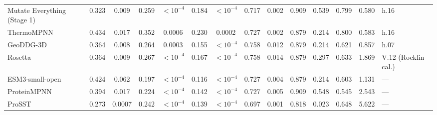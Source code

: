 \begin{table}[H]
{\begin{tabular}{lccccccccccccl}
Mutate Everything (Stage 1) & 0.323 & 0.009 & 0.259 & $<10^{-4}$ & 0.184 & $<10^{-4}$ & 0.717 & 0.002 & 0.909 & 0.539 & 0.799 & 0.580 & h.16 \\
ThermoMPNN & 0.434 & 0.017 & 0.352 & 0.0006 & 0.230 & 0.0002 & 0.727 & 0.002 & 0.879 & 0.214 & 0.800 & 0.583 & h.16 \\
GeoDDG-3D & 0.364 & 0.008 & 0.264 & 0.0003 & 0.155 & $<10^{-4}$ & 0.758 & 0.012 & 0.879 & 0.214 & 0.621 & 0.857 & h.07 \\
Rosetta & 0.364 & 0.009 & 0.267 & $<10^{-4}$ & 0.167 & $<10^{-4}$ & 0.758 & 0.014 & 0.879 & 0.297 & 0.633 & 1.869 & V.12 (Rocklin cal.) \\
ESM3-small-open & 0.424 & 0.062 & 0.197 & $<10^{-4}$ & 0.116 & $<10^{-4}$ & 0.727 & 0.004 & 0.879 & 0.214 & 0.603 & 1.131 & --- \\
ProteinMPNN & 0.394 & 0.017 & 0.224 & $<10^{-4}$ & 0.142 & $<10^{-4}$ & 0.727 & 0.005 & 0.909 & 0.548 & 0.545 & 2.543 & --- \\
ProSST & 0.273 & 0.0007 & 0.242 & $<10^{-4}$ & 0.139 & $<10^{-4}$ & 0.697 & 0.001 & 0.818 & 0.023 & 0.648 & 5.622 & --- \\
\bottomrule
\end{tabular}
}
\end{table}

